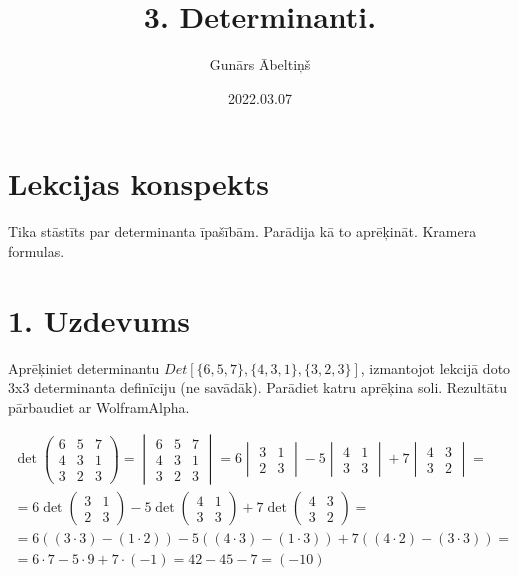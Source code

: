 \documentclass{article}
\title{3. Determinanti.}
\author{Gunārs Ābeltiņš}
\date{2022.03.07}
\begin{document}
\maketitle

\section*{Lekcijas konspekts}
Tika stāstīts par determinanta īpašībām. Parādija kā to aprēķināt. Kramera formulas.

\clearpage

\section*{1. Uzdevums}
Aprēķiniet determinantu $Det[\{6,5,7\},\{4,3,1\},\{3,2,3\}]$, izmantojot lekcijā doto 3x3 determinanta definīciju (ne savādāk). Parādiet katru aprēķina soli. Rezultātu pārbaudiet ar WolframAlpha.

\begin{gather*}
    \det
    \begin{pmatrix}
        6 & 5 & 7\\
        4 & 3 & 1\\
        3 & 2 & 3
    \end{pmatrix} 
    =
    \begin{vmatrix}
        6 & 5 & 7\\
        4 & 3 & 1\\
        3 & 2 & 3
    \end{vmatrix}
    =
    6 \begin{vmatrix} 3 & 1 \\ 2 & 3 \end{vmatrix} 
    - 5 \begin{vmatrix} 4 & 1 \\ 3 & 3 \end{vmatrix} 
    + 7 \begin{vmatrix} 4 & 3 \\ 3 & 2 \end{vmatrix}
    =
    \\
    =
    6 \det\begin{pmatrix} 3 & 1 \\ 2 & 3 \end{pmatrix} 
    - 5 \det\begin{pmatrix} 4 & 1 \\ 3 & 3 \end{pmatrix} 
    + 7 \det\begin{pmatrix} 4 & 3 \\ 3 & 2 \end{pmatrix}
    =
    \\
    =
    6((3 \cdot 3) - (1 \cdot 2)) 
    - 5((4 \cdot 3) - (1 \cdot 3)) 
    + 7((4 \cdot 2) - (3 \cdot 3))
    =
    \\
    =
    6 \cdot 7 - 5 \cdot 9 + 7 \cdot (-1)
    =
    42 - 45 - 7
    =
    (-10)
\end{gather*}
\end{document}
